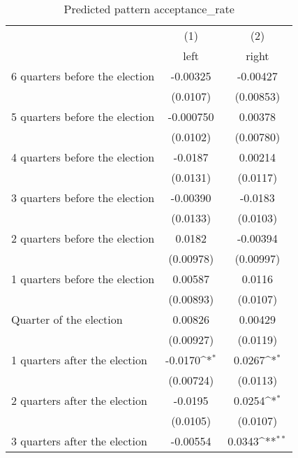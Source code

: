 \begin{table}[htbp]\centering
\def\sym#1{\ifmmode^{#1}\else\(^{#1}\)\fi}
\caption{Predicted pattern acceptance\_rate}
\begin{tabular}{l*{2}{c}}
\hline\hline
                    &\multicolumn{1}{c}{(1)}&\multicolumn{1}{c}{(2)}\\
                    &\multicolumn{1}{c}{left}&\multicolumn{1}{c}{right}\\
\hline
 6 quarters before the election&    -0.00325         &    -0.00427         \\
                    &    (0.0107)         &   (0.00853)         \\
[1em]
 5 quarters before the election&   -0.000750         &     0.00378         \\
                    &    (0.0102)         &   (0.00780)         \\
[1em]
 4 quarters before the election&     -0.0187         &     0.00214         \\
                    &    (0.0131)         &    (0.0117)         \\
[1em]
 3 quarters before the election&    -0.00390         &     -0.0183         \\
                    &    (0.0133)         &    (0.0103)         \\
[1em]
 2 quarters before the election&      0.0182         &    -0.00394         \\
                    &   (0.00978)         &   (0.00997)         \\
[1em]
 1 quarters before the election&     0.00587         &      0.0116         \\
                    &   (0.00893)         &    (0.0107)         \\
[1em]
Quarter of the election&     0.00826         &     0.00429         \\
                    &   (0.00927)         &    (0.0119)         \\
[1em]
 1 quarters after the election&     -0.0170\sym{*}  &      0.0267\sym{*}  \\
                    &   (0.00724)         &    (0.0113)         \\
[1em]
 2 quarters after the election&     -0.0195         &      0.0254\sym{*}  \\
                    &    (0.0105)         &    (0.0107)         \\
[1em]
 3 quarters after the election&    -0.00554         &      0.0343\sym{**} \\

\end{tabular}
\end{table}
